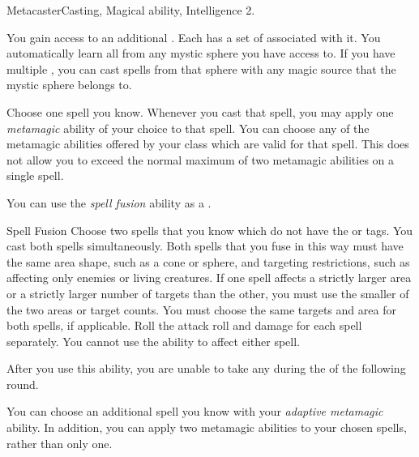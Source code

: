     \begin{magicalfeat}{Metacaster}{Casting, Magical}
        \featpre {} ability, Intelligence 2.

         You gain access to an additional .
        Each  has a set of  associated with it.
        You automatically learn all  from any mystic sphere you have access to.
        If you have multiple , you can cast spells from that sphere with any magic source that the mystic sphere belongs to.

         Choose one spell you know.
        Whenever you cast that spell, you may apply one \textit{metamagic} ability of your choice to that spell.
        You can choose any of the metamagic abilities offered by your class which are valid for that spell.
        This does not allow you to exceed the normal maximum of two metamagic abilities on a single spell.

         You can use the \textit{spell fusion} ability as a .
        \begin{magicalactiveability}{Spell Fusion}
            \rankline
            Choose two spells that you know which do not have the  or  tags.
            You cast both spells simultaneously.
            Both spells that you fuse in this way must have the same area shape, such as a cone or sphere, and targeting restrictions, such as affecting only enemies or living creatures.
            If one spell affects a strictly larger area or a strictly larger number of targets than the other, you must use the smaller of the two areas or target counts.
            You must choose the same targets and area for both spells, if applicable.
            Roll the attack roll and damage for each spell separately.
            You cannot use the  ability to affect either spell.

            After you use this ability, you are unable to take any  during the  of the following round.
        \end{magicalactiveability}

         You can choose an additional spell you know with your \textit{adaptive metamagic} ability.
        In addition, you can apply two metamagic abilities to your chosen spells, rather than only one.
    \end{magicalfeat}

